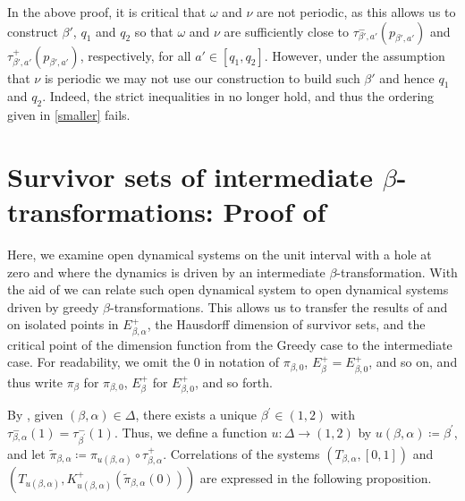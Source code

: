 \documentclass[a4paper,reqno,10pt]{amsart}
\begin{document}
In the above proof, it is critical that $\omega$ and $\nu$ are not periodic, as this allows us to construct $\beta'$, $q_{1}$ and $q_{2}$ so that $\omega$ and $\nu$ are sufficiently close to $\tau_{\beta',a'}^{-}(p_{\beta',a'})$ and $\tau_{\beta',a'}^{+}(p_{\beta',a'})$, respectively, for all $a' \in [q_{1}, q_{2}]$. However, under the assumption that $\nu$ is periodic we may not use our construction to build such $\beta'$ and hence $q_{1}$ and $q_{2}$.  Indeed, the strict inequalities in  no longer hold, and thus the ordering given in \eqref{smaller} fails.

%
%
%
\section{Survivor sets of intermediate \texorpdfstring{$\beta$}{beta}-transformations: Proof of \texorpdfstring{}{Corollaries 1.3 and 1.4}}\label{sec:proof_cor_1_3_4}
%
%
%

Here, we examine open dynamical systems on the unit interval with a hole at zero and where the dynamics is driven by an intermediate \mbox{$\beta$-transformation}. With the aid of  we can relate such open dynamical system to open dynamical systems driven by greedy \mbox{$\beta$-transformations}. This allows us to transfer the results of \cite{KKLL} and \cite{AK} on isolated points in $E_{\beta,\alpha}^+$, the Hausdorff dimension of survivor sets, and the critical point of the dimension function from the Greedy case to the intermediate case. For readability, we omit the $0$ in notation of $\pi_{\beta,0}$, $E_{\beta}^+=E_{\beta,0}^+$, and so on, and thus write $\pi_{\beta}$ for $\pi_{\beta,0}$, $E_{\beta}^+$ for $E_{\beta,0}^+$, and so forth.

By , given $(\beta,\alpha) \in \Delta$, there exists a unique $\beta^\prime \in (1, 2)$ with $\tau_{\beta,\alpha}^-(1)=\tau_{\beta^\prime}^-(1)$. Thus, we define a function $u \colon \Delta \to (1, 2)$ by $u(\beta,\alpha) \coloneqq \beta^\prime$, and let $\tilde{\pi}_{\beta,\alpha} \coloneqq \pi_{u(\beta,\alpha)} \circ \tau_{\beta,\alpha}^{+}$.  Correlations of the systems $(T_{\beta,\alpha},[0,1])$ and $(T_{u(\beta,\alpha)},K_{u(\beta,\alpha)}^+(\tilde{\pi}_{\beta,\alpha}(0)))$ are expressed in the following proposition.
\end{document}

